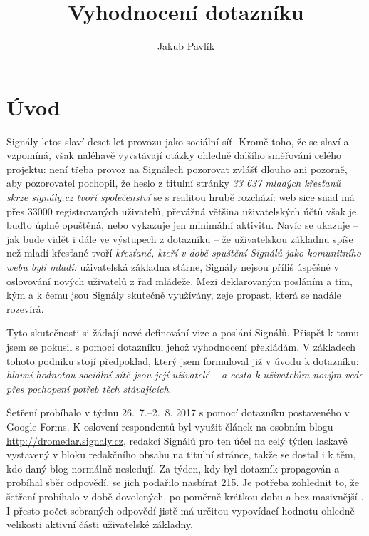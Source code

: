 \documentclass[12pt, a4paper, twoside]{article}
\author{Jakub Pavlík}
\title{Vyhodnocení dotazníku\\ \uv{signaly.cz z pohledu uživatelů}}
\begin{document}
\setlength{\parindent}{0.5cm}

\maketitle

\section*{Úvod}

Signály letos slaví deset let provozu jako sociální síť.
Kromě toho, že se slaví a vzpomíná, však naléhavě vyvstávají otázky
ohledně dalšího směřování celého projektu:
není třeba provoz na Signálech pozorovat zvlášť dlouho ani pozorně,
aby pozorovatel pochopil, že heslo z titulní stránky
\emph{33 637 mladých křesťanů skrze signály.cz tvoří společenství}
se s realitou hrubě rozchází:
web sice snad má přes 33000 registrovaných
uživatelů, převážná většina uživatelských účtů však je buďto
úplně opuštěná, nebo vykazuje jen minimální aktivitu.
Navíc se ukazuje -- jak bude vidět i dále ve výstupech z dotazníku --
že uživatelskou základnu spíše než mladí křesťané
tvoří \emph{křesťané, kteří v době spuštění Signálů jako komunitního
  webu byli mladí:}
uživatelská základna stárne, Signály nejsou příliš úspěšné
v oslovování nových uživatelů z řad mládeže.
Mezi deklarovaným posláním a tím, kým a k čemu jsou Signály skutečně
využívány, zeje propast, která se nadále rozevírá.

Tyto skutečnosti si žádají nové definování vize a poslání Signálů.
Přispět k tomu jsem se pokusil s pomocí dotazníku, jehož vyhodnocení
překládám. V základech tohoto podniku stojí předpoklad,
který jsem formuloval již v úvodu k dotazníku:
\emph{hlavní hodnotou sociální sítě jsou její uživatelé --
  a cesta k uživatelům novým vede přes pochopení potřeb těch
  stávajících}.

Šetření probíhalo v týdnu 26.~7.--2.~8. 2017
s pomocí dotazníku postaveného v Google Forms.
K oslovení respondentů byl využit článek na osobním blogu
\url{http://dromedar.signaly.cz}, redakcí Signálů pro ten účel
na celý týden laskavě vystavený v bloku redakčního obsahu
na titulní stránce, takže se dostal i k těm, kdo daný blog normálně
nesledují.
Za týden, kdy byl dotazník propagován a probíhal sběr odpovědí,
se jich podařilo nasbírat 215. Je potřeba zohlednit to, že
šetření probíhalo v době dovolených, po poměrně krátkou dobu
a bez masivnější .
I přesto počet sebraných odpovědí jistě má určitou vypovídací
hodnotu ohledně velikosti aktivní části uživatelské základny.
\end{document}

